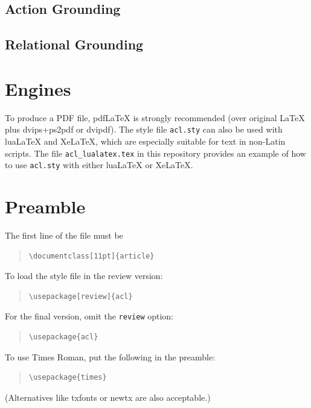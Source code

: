 \documentclass[11pt]{article}
\begin{document}
\subsection{Action Grounding}

\subsection{Relational Grounding}



\section{Engines}

To produce a PDF file, pdf\LaTeX{} is strongly recommended (over original \LaTeX{} plus dvips+ps2pdf or dvipdf).
The style file \texttt{acl.sty} can also be used with
lua\LaTeX{} and
Xe\LaTeX{}, which are especially suitable for text in non-Latin scripts.
The file \texttt{acl\_lualatex.tex} in this repository provides
an example of how to use \texttt{acl.sty} with either
lua\LaTeX{} or
Xe\LaTeX{}.

\section{Preamble}

The first line of the file must be
\begin{quote}
\begin{verbatim}
\documentclass[11pt]{article}
\end{verbatim}
\end{quote}

To load the style file in the review version:
\begin{quote}
\begin{verbatim}
\usepackage[review]{acl}
\end{verbatim}
\end{quote}
For the final version, omit the \verb|review| option:
\begin{quote}
\begin{verbatim}
\usepackage{acl}
\end{verbatim}
\end{quote}

To use Times Roman, put the following in the preamble:
\begin{quote}
\begin{verbatim}
\usepackage{times}
\end{verbatim}
\end{quote}
(Alternatives like txfonts or newtx are also acceptable.)
\end{document}

